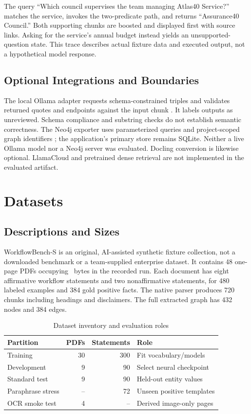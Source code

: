 \documentclass[conference]{IEEEtran}
\begin{document}
The query ``Which council supervises the team managing Atlas40 Service?'' matches the service, invokes the two-predicate path, and returns ``Assurance40 Council.'' Both supporting chunks are boosted and displayed first with source links. Asking for the service's annual budget instead yields an unsupported-question state. This trace describes actual fixture data and executed output, not a hypothetical model response.

\subsection{Optional Integrations and Boundaries}
The local Ollama adapter requests schema-constrained triples and validates returned quotes and endpoints against the input chunk \cite{ollama}. It labels outputs as unreviewed. Schema compliance and substring checks do not establish semantic correctness. The Neo4j exporter uses parameterized queries and project-scoped graph identifiers \cite{neo4j}; the application's primary store remains SQLite. Neither a live Ollama model nor a Neo4j server was evaluated. Docling conversion is likewise optional. LlamaCloud and pretrained dense retrieval are not implemented in the evaluated artifact.

\section{Datasets}
\label{sec:data}
\subsection{Descriptions and Sizes}
WorkflowBench-S is an original, AI-assisted synthetic fixture collection, not a downloaded benchmark or a team-supplied enterprise dataset. It contains 48 one-page PDFs occupying \RawBytes\ bytes in the recorded run. Each document has eight affirmative workflow statements and two nonaffirmative statements, for 480 labeled examples and 384 gold positive facts. The native parser produces 720 chunks including headings and disclaimers. The full extracted graph has 432 nodes and 384 edges.

\begin{table}[t]
\centering\caption{Dataset inventory and evaluation roles}
\label{tab:data}
\begin{tabular}{lrrl}\toprule
Partition & PDFs & Statements & Role\\\midrule
Training & 30 & 300 & Fit vocabulary/models\\
Development & 9 & 90 & Select neural checkpoint\\
Standard test & 9 & 90 & Held-out entity values\\
Paraphrase stress & -- & 72 & Unseen positive templates\\
OCR smoke test & 4 & -- & Derived image-only pages\\\bottomrule
\end{tabular}
\end{table}
\end{document}
